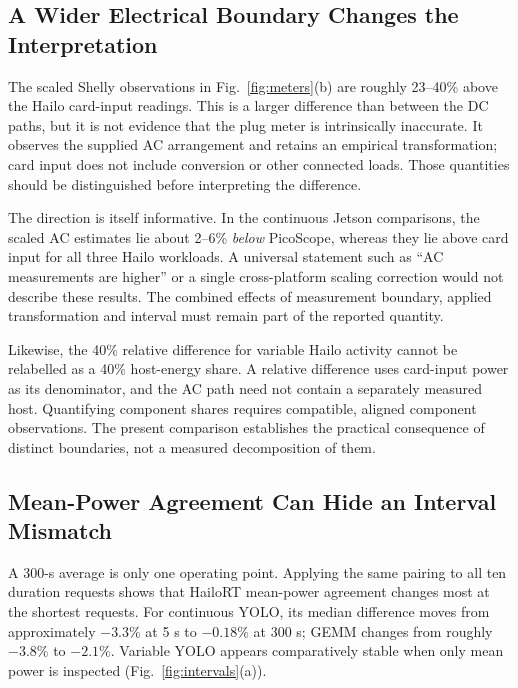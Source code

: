 \subsection{A Wider Electrical Boundary Changes the Interpretation}
The scaled Shelly observations in Fig.~\ref{fig:meters}(b) are roughly 23--40\% above the Hailo card-input readings. This is a larger difference than between the DC paths, but it is not evidence that the plug meter is intrinsically inaccurate. It observes the supplied AC arrangement and retains an empirical transformation; card input does not include conversion or other connected loads. Those quantities should be distinguished before interpreting the difference.

The direction is itself informative. In the continuous Jetson comparisons, the scaled AC estimates lie about 2--6\% \emph{below} PicoScope, whereas they lie above card input for all three Hailo workloads. A universal statement such as ``AC measurements are higher'' or a single cross-platform scaling correction would not describe these results. The combined effects of measurement boundary, applied transformation and interval must remain part of the reported quantity.

Likewise, the 40\% relative difference for variable Hailo activity cannot be relabelled as a 40\% host-energy share. A relative difference uses card-input power as its denominator, and the AC path need not contain a separately measured host. Quantifying component shares requires compatible, aligned component observations. The present comparison establishes the practical consequence of distinct boundaries, not a measured decomposition of them.

\subsection{Mean-Power Agreement Can Hide an Interval Mismatch}
A 300-s average is only one operating point. Applying the same pairing to all ten duration requests shows that HailoRT mean-power agreement changes most at the shortest requests. For continuous YOLO, its median difference moves from approximately $-3.3\%$ at 5 s to $-0.18\%$ at 300 s; GEMM changes from roughly $-3.8\%$ to $-2.1\%$. Variable YOLO appears comparatively stable when only mean power is inspected (Fig.~\ref{fig:intervals}(a)).

